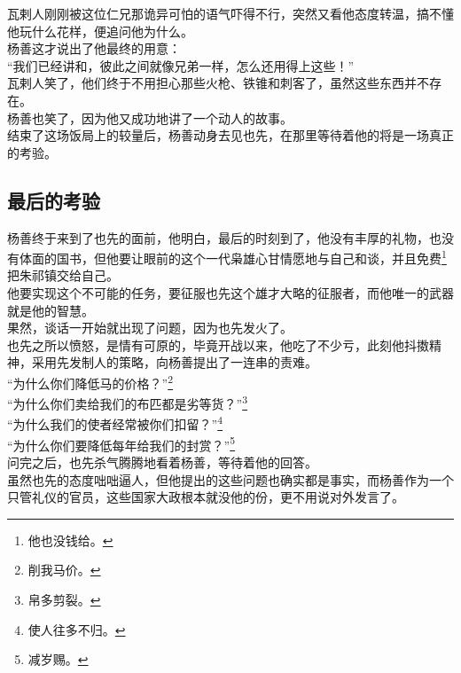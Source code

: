 \begin{multicols}{\theparacolNo}
瓦剌人刚刚被这位仁兄那诡异可怕的语气吓得不行，突然又看他态度转温，搞不懂他玩什么花样，便追问他为什么。\\

杨善这才说出了他最终的用意：\\

“我们已经讲和，彼此之间就像兄弟一样，怎么还用得上这些！”\\

瓦剌人笑了，他们终于不用担心那些火枪、铁锥和刺客了，虽然这些东西并不存在。\\

杨善也笑了，因为他又成功地讲了一个动人的故事。\\

结束了这场饭局上的较量后，杨善动身去见也先，在那里等待着他的将是一场真正的考验。\\

\subsection{最后的考验}
杨善终于来到了也先的面前，他明白，最后的时刻到了，他没有丰厚的礼物，也没有体面的国书，但他要让眼前的这个一代枭雄心甘情愿地与自己和谈，并且免费\footnote{他也没钱给。}把朱祁镇交给自己。\\

他要实现这个不可能的任务，要征服也先这个雄才大略的征服者，而他唯一的武器就是他的智慧。\\

果然，谈话一开始就出现了问题，因为也先发火了。\\

也先之所以愤怒，是情有可原的，毕竟开战以来，他吃了不少亏，此刻他抖擞精神，采用先发制人的策略，向杨善提出了一连串的责难。\\

“为什么你们降低马的价格？”\footnote{削我马价。}\\

“为什么你们卖给我们的布匹都是劣等货？”\footnote{帛多剪裂。}\\

“为什么我们的使者经常被你们扣留？”\footnote{使人往多不归。}\\

“为什么你们要降低每年给我们的封赏？”\footnote{减岁赐。}\\

问完之后，也先杀气腾腾地看着杨善，等待着他的回答。\\

虽然也先的态度咄咄逼人，但他提出的这些问题也确实都是事实，而杨善作为一个只管礼仪的官员，这些国家大政根本就没他的份，更不用说对外发言了。\\


\end{multicols}

